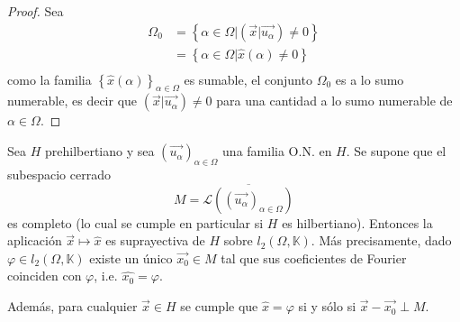 \documentclass[12pt]{report}
\theoremstyle{largebreak}
\newcommand\pint[2]{\ensuremath{\left(#1\big| #2\right)}}
\begin{document}
    \begin{proof}
        Sea
        \begin{equation*}
            \begin{split}
                \Omega_0
                &=\left\{\alpha\in\Omega\Big| \pint{\vec{x}}{\vec{u_\alpha}} \neq0 \right\}\\
                &=\left\{\alpha\in\Omega\Big| \hat{x}(\alpha)\neq0 \right\}\\
            \end{split}
        \end{equation*}
        como la familia $\left\{\hat{x}(\alpha) \right\}_{\alpha\in\Omega}$ es sumable, el conjunto $\Omega_0$ es a lo sumo numerable, es decir que $\pint{\vec{x}}{\vec{u_\alpha}}\neq0$ para una cantidad a lo sumo numerable de $\alpha\in\Omega$.
    \end{proof}

    \begin{theor}
        Sea $H$ prehilbertiano y sea $(\vec{u_\alpha})_{\alpha\in\Omega}$ una familia O.N. en $H$. Se supone que el subespacio cerrado
        \begin{equation*}
            M=\overline{\mathcal{L}((\vec{u_\alpha})_{\alpha\in\Omega})}
        \end{equation*}
        es completo (lo cual se cumple en particular si $H$ es hilbertiano). Entonces la aplicación $\vec{x}\mapsto\hat{x}$ es suprayectiva de $H$ sobre $l_2(\Omega,\mathbb{K})$. Más precisamente, dado $\varphi\in l_2(\Omega,\mathbb{K})$ existe un único $\vec{x_0}\in M$ tal que sus coeficientes de Fourier coinciden con $\varphi$, i.e. $\hat{x_0}=\varphi$.
        
        Además, para cualquier $\vec{x}\in H$ se cumple que $\hat{x}=\varphi$ si y sólo si $\vec{x}-\vec{x_0}\perp M$. 
    \end{theor}
\end{document}
